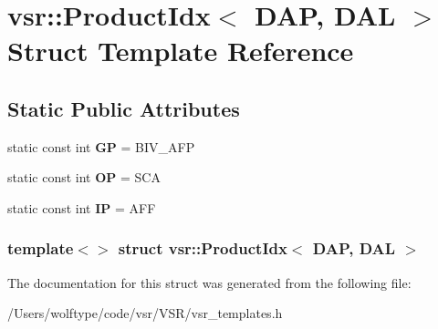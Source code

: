 \hypertarget{structvsr_1_1_product_idx_3_01_d_a_p_00_01_d_a_l_01_4}{\section{vsr\-:\-:Product\-Idx$<$ D\-A\-P, D\-A\-L $>$ Struct Template Reference}
\label{structvsr_1_1_product_idx_3_01_d_a_p_00_01_d_a_l_01_4}
}
\subsection*{Static Public Attributes}
\begin{DoxyCompactItemize}
\item 
\hypertarget{structvsr_1_1_product_idx_3_01_d_a_p_00_01_d_a_l_01_4_aaab15c46a8ffe067978f6d5d5b14f16c}{static const int {\bfseries G\-P} = B\-I\-V\-\_\-\-A\-F\-P}\label{structvsr_1_1_product_idx_3_01_d_a_p_00_01_d_a_l_01_4_aaab15c46a8ffe067978f6d5d5b14f16c}

\item 
\hypertarget{structvsr_1_1_product_idx_3_01_d_a_p_00_01_d_a_l_01_4_a0d555633185d042d6e67583098b08e0b}{static const int {\bfseries O\-P} = S\-C\-A}\label{structvsr_1_1_product_idx_3_01_d_a_p_00_01_d_a_l_01_4_a0d555633185d042d6e67583098b08e0b}

\item 
\hypertarget{structvsr_1_1_product_idx_3_01_d_a_p_00_01_d_a_l_01_4_aa5a7b25ff902efdf4515cf2de1ddb5d6}{static const int {\bfseries I\-P} = A\-F\-F}\label{structvsr_1_1_product_idx_3_01_d_a_p_00_01_d_a_l_01_4_aa5a7b25ff902efdf4515cf2de1ddb5d6}

\end{DoxyCompactItemize}
\subsubsection*{template$<$$>$ struct vsr\-::\-Product\-Idx$<$ D\-A\-P, D\-A\-L $>$}



The documentation for this struct was generated from the following file\-:\begin{DoxyCompactItemize}
\item 
/\-Users/wolftype/code/vsr/\-V\-S\-R/vsr\-\_\-templates.\-h\end{DoxyCompactItemize}
